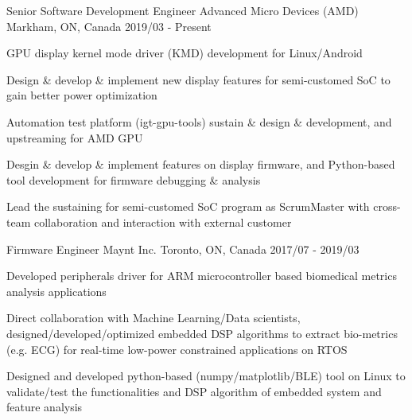 


\begin{cventries}

\cventry
{Senior Software Development Engineer} %
{Advanced Micro Devices (AMD)} %
{Markham, ON, Canada} %
{2019/03 - Present} %
{ %
\begin{cvitems}
\item {GPU display kernel mode driver (KMD) development for Linux/Android}
%
\item {Design \& develop \& implement new display features for semi-customed SoC to gain better power optimization}
%
\item {Automation test platform (igt-gpu-tools) sustain \& design \& development, and upstreaming for AMD GPU}
%
\item {Desgin \& develop \& implement features on display firmware, and Python-based tool development for firmware debugging \& analysis}
%
\item {Lead the sustaining for semi-customed SoC program as ScrumMaster with cross-team collaboration and interaction with external customer}
\end{cvitems}
}

\cventry
{Firmware Engineer} %
{Maynt Inc.} %
{Toronto, ON, Canada} %
{2017/07 - 2019/03} %
{ %
\begin{cvitems}
\item {Developed peripherals driver for ARM microcontroller based biomedical metrics analysis applications}
\item {Direct collaboration with Machine Learning/Data scientists, designed/developed/optimized embedded DSP algorithms to extract bio-metrics (e.g. ECG) for real-time low-power constrained applications on RTOS}
\item {Designed and developed python-based (numpy/matplotlib/BLE) tool on Linux to validate/test the functionalities and DSP algorithm of embedded system and feature analysis}
\end{cvitems}
}


\end{cventries}
